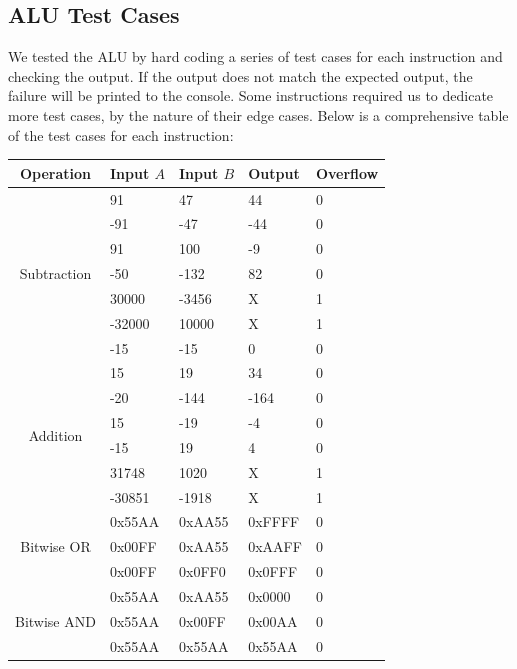 \documentclass[11pt]{article}
\begin{document}
\subsection{ALU Test Cases}
We tested the ALU by hard coding a series of test cases for each instruction and checking the output. If the output does not match the expected output, the failure will be printed to the console. Some instructions required us to dedicate more test cases, by the nature of their edge cases. Below is a comprehensive table of the test cases for each instruction: \\

{\centering
\begin{tabular}{|c|l|l|l|l|}
	\hline
	\textbf{Operation} & \textbf{Input $A$} & \textbf{Input $B$} & \textbf{Output} & \textbf{Overflow} \\
	\hline
	
	\multirow{7}{*}{Subtraction} & 91 & 47 & 44 & 0 \\
	& -91 & -47 & -44 & 0 \\
	& 91 & 100 & -9 & 0 \\
	& -50 & -132 & 82 & 0 \\
	& 30000 & -3456 & X & 1 \\
	& -32000 & 10000 & X & 1 \\
	& -15 & -15 & 0 & 0 \\
	\hline
	
	\multirow{6}{*}{Addition} & 15 & 19 & 34 & 0 \\
	& -20 & -144 & -164 & 0 \\
	& 15 & -19 & -4 & 0 \\
	& -15 & 19 & 4 & 0 \\
	& 31748 & 1020 & X & 1 \\
	& -30851 & -1918 & X & 1 \\
	\hline
	
	\multirow{3}{*}{Bitwise OR} & 0x55AA & 0xAA55 & 0xFFFF & 0 \\
	& 0x00FF & 0xAA55 & 0xAAFF & 0 \\
	& 0x00FF & 0x0FF0 & 0x0FFF & 0 \\
	\hline
	
	\multirow{3}{*}{Bitwise AND} & 0x55AA & 0xAA55 & 0x0000 & 0 \\
	& 0x55AA & 0x00FF & 0x00AA & 0 \\
	& 0x55AA & 0x55AA & 0x55AA & 0 \\
	\hline
\end{tabular} \par
}
\end{document}
